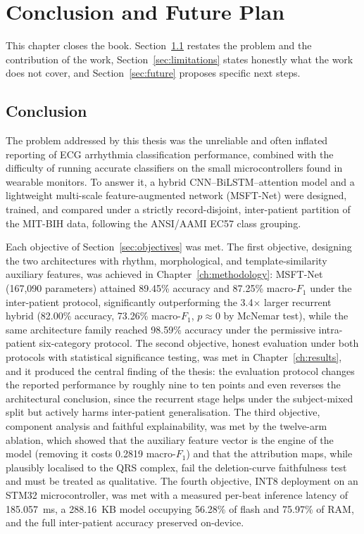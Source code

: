 
\chapter{Conclusion and Future Plan}
\label{ch:conclusion}

This chapter closes the book. Section~\ref{sec:ch6_conclusion} restates the
problem and the contribution of the work, Section~\ref{sec:limitations}
states honestly what the work does not cover, and Section~\ref{sec:future}
proposes specific next steps.


\section{Conclusion}
\label{sec:ch6_conclusion}

The problem addressed by this thesis was the unreliable and often inflated
reporting of ECG arrhythmia classification performance, combined with the
difficulty of running accurate classifiers on the small microcontrollers
found in wearable monitors. To answer it, a
hybrid CNN--BiLSTM--attention model and a lightweight multi-scale
feature-augmented network (MSFT-Net) were designed, trained, and compared
under a strictly record-disjoint, inter-patient partition of the MIT-BIH
data, following the ANSI/AAMI EC57 class grouping.

Each objective of Section~\ref{sec:objectives} was met. The first
objective, designing the two architectures with rhythm, morphological, and
template-similarity auxiliary features, was achieved in
Chapter~\ref{ch:methodology}: MSFT-Net (167{,}090 parameters) attained
89.45\% accuracy and 87.25\% macro-$F_1$ under the inter-patient protocol,
significantly outperforming the 3.4$\times$ larger recurrent hybrid
(82.00\% accuracy, 73.26\% macro-$F_1$, $p \approx 0$ by McNemar test),
while the same architecture family reached 98.59\% accuracy under the
permissive intra-patient six-category protocol. The second objective, honest
evaluation under both protocols with statistical significance testing, was
met in Chapter~\ref{ch:results}, and it produced the central finding of the
thesis: the evaluation protocol changes the reported performance by roughly
nine to ten points and even reverses the architectural conclusion, since
the recurrent stage helps under the subject-mixed split but actively harms
inter-patient generalisation. The third objective, component analysis and
faithful explainability, was met by the twelve-arm ablation, which showed
that the auxiliary feature vector is the engine of the model (removing it
costs 0.2819 macro-$F_1$) and that the attribution maps, while plausibly
localised to the QRS complex, fail the deletion-curve faithfulness test and
must be treated as qualitative. The fourth objective, INT8 deployment on an
STM32 microcontroller, was met with a measured per-beat inference latency
of 185.057~ms, a 288.16~KB model occupying 56.28\% of flash and 75.97\% of
RAM, and the full inter-patient accuracy preserved on-device.

